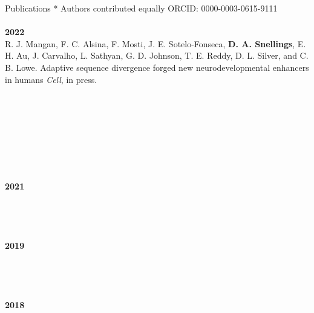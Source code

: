 \documentclass{resume} %
\begin{document}
\begin{rSection}{Publications}
{* Authors contributed equally} \hfill {ORCID: 0000-0003-0615-9111}
%
\\ \\ {\bf 2022} 
\\ R. J. Mangan, F. C. Alsina, F. Mosti, J. E. Sotelo-Fonseca, {\bf D. A. Snellings}, E. H. Au, J. Carvalho, L. Sathyan, G. D. Johnson, T. E. Reddy, D. L. Silver, and C. B. Lowe. 
Adaptive sequence divergence forged new neurodevelopmental enhancers in humans
 \textit{Cell}, in press.
\\
\\ 
\\
\\ 
\\
\\ 
\\ 
%
\\ \\ {\bf 2021} 
\\ 
\\
\\ 
%
\\ \\{\bf 2019} 
\\ 
\\
\\ 
%
\\ \\ {\bf 2018}
\\ 
\\
\\ 
\\
\end{rSection}
\end{document}
